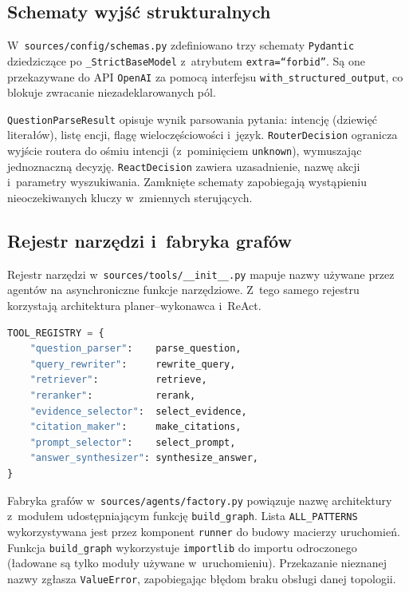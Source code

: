 \subsection{Schematy wyjść strukturalnych}\label{subsec:schematy-wyjsc-strukturalnych}

W~\texttt{sources/config/schemas.py} zdefiniowano trzy schematy
\texttt{Pydantic} dziedziczące po \texttt{\_StrictBaseModel} z~atrybutem
\texttt{extra=``forbid''}. Są one przekazywane do API \texttt{OpenAI} za pomocą
interfejsu \texttt{with\_structured\_output}, co blokuje zwracanie
niezadeklarowanych pól.

\texttt{QuestionParseResult} opisuje wynik parsowania pytania: intencję
(dziewięć literałów), listę encji, flagę wieloczęściowości i~język.
\texttt{RouterDecision} ogranicza wyjście routera do ośmiu intencji
(z~pominięciem \texttt{unknown}), wymuszając jednoznaczną decyzję. \texttt{ReactDecision}
zawiera uzasadnienie, nazwę akcji i~parametry wyszukiwania.
Zamknięte schematy zapobiegają wystąpieniu nieoczekiwanych kluczy w~zmiennych
sterujących.

\subsection{Rejestr narzędzi i~fabryka grafów}\label{subsec:rejestr-narzedzi-i-fabryka-grafow}

Rejestr narzędzi w~\texttt{sources/tools/\_\_init\_\_.py} mapuje nazwy używane
przez agentów na asynchroniczne funkcje narzędziowe. Z~tego samego rejestru
korzystają architektura planer--wykonawca i~ReAct.

\begin{lstlisting}[language=Python,
  caption={Rejestr narzędzi agentowych},
  label={lst:rejestr-narzedzi-agentowych}]
TOOL_REGISTRY = {
    "question_parser":    parse_question,
    "query_rewriter":     rewrite_query,
    "retriever":          retrieve,
    "reranker":           rerank,
    "evidence_selector":  select_evidence,
    "citation_maker":     make_citations,
    "prompt_selector":    select_prompt,
    "answer_synthesizer": synthesize_answer,
}
\end{lstlisting}

Fabryka grafów w~\texttt{sources/agents/factory.py} powiązuje nazwę
architektury z~modułem udostępniającym funkcję \texttt{build\_graph}. Lista
\texttt{ALL\_PATTERNS} wykorzystywana jest przez komponent \texttt{runner} do
budowy macierzy uruchomień. Funkcja \texttt{build\_graph} wykorzystuje
\texttt{importlib} do importu odroczonego (ładowane są tylko moduły używane
w~uruchomieniu). Przekazanie nieznanej nazwy zgłasza \texttt{ValueError},
zapobiegając błędom braku obsługi danej topologii.

